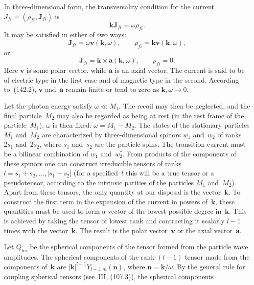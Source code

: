 In three-dimensional form, the transversality condition for the current $J_{fi}=(\rho_{fi},\mathbf J_{fi})$ is
\begin{equation}
\mathbf k\mathbf J_{fi}=\omega\rho_{fi}.
\tag{142.3}
\end{equation}
It may be satisfied in either of two ways:
\begin{equation}
\mathbf J_{fi}=\omega\mathbf v(\mathbf k,\omega),\qquad
\rho_{fi}=\mathbf k\mathbf v(\mathbf k,\omega),
\tag{142.4}
\end{equation}
or
\begin{equation}
\mathbf J_{fi}=\mathbf k\times\mathbf a(\mathbf k,\omega),\qquad
\rho_{fi}=0.
\tag{142.5}
\end{equation}
Here $\mathbf v$ is some polar vector, while $\mathbf a$ is an axial vector. The current is said to be of electric type in the first case and of magnetic type in the second. According to~(142.2), $\mathbf v$ and~$\mathbf a$ remain finite or tend to zero as $\mathbf k,\omega\to0$.

Let the photon energy satisfy $\omega\ll M_1$. The recoil may then be neglected, and the final particle~$M_2$ may also be regarded as being at rest (in the rest frame of the particle~$M_1$); $\omega$ is then fixed: $\omega=M_1-M_2$. The states of the stationary particles $M_1$ and~$M_2$ are characterized by three-dimensional spinors $w_1$ and~$w_2$ of ranks $2s_1$ and~$2s_2$, where $s_1$ and~$s_2$ are the particle spins. The transition current must be a bilinear combination of $w_1$ and~$w_2^*$. From products of the components of these spinors one can construct irreducible tensors of ranks $l=s_1+s_2,\ldots,|s_1-s_2|$ (for a specified~$l$ this will be a true tensor or a pseudotensor, according to the intrinsic parities of the particles $M_1$ and~$M_2$). Apart from these tensors, the only quantity at our disposal is the vector~$\mathbf k$. To construct the first term in the expansion of the current in powers of~$\mathbf k$, these quantities must be used to form a vector of the lowest possible degree in~$\mathbf k$. This is achieved by taking the tensor of lowest rank and contracting it scalarly $l-1$ times with the vector~$\mathbf k$. The result is the polar vector~$\mathbf v$ or the axial vector~$\mathbf a$.

Let $Q_{lm}$ be the spherical components of the tensor formed from the particle wave amplitudes. The spherical components of the rank-$(l-1)$ tensor made from the components of~$\mathbf k$ are $|\mathbf k|^{l-1}Y_{l-1,m}(\mathbf n)$, where $\mathbf n=\mathbf k/\omega$. By the general rule for coupling spherical tensors (see~III, (107.3)), the spherical components

